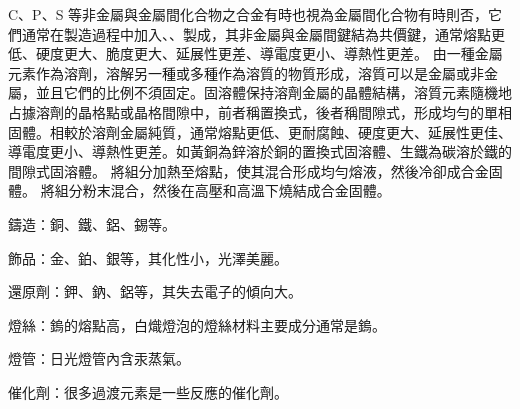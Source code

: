 \documentclass[a4paper,12pt]{report}
\begin{document}
C、P、S 等非金屬與金屬間化合物之合金有時也視為金屬間化合物有時則否，它們通常在製造過程中加入、、製成，其非金屬與金屬間鍵結為共價鍵，通常熔點更低、硬度更大、脆度更大、延展性更差、導電度更小、導熱性更差。
由一種金屬元素作為溶劑，溶解另一種或多種作為溶質的物質形成，溶質可以是金屬或非金屬，並且它們的比例不須固定。固溶體保持溶劑金屬的晶體結構，溶質元素隨機地占據溶劑的晶格點或晶格間隙中，前者稱置換式，後者稱間隙式，形成均勻的單相固體。相較於溶劑金屬純質，通常熔點更低、更耐腐蝕、硬度更大、延展性更佳、導電度更小、導熱性更差。如黃銅為鋅溶於銅的置換式固溶體、生鐵為碳溶於鐵的間隙式固溶體。
將組分加熱至熔點，使其混合形成均勻熔液，然後冷卻成合金固體。
將組分粉末混合，然後在高壓和高溫下燒結成合金固體。
\bit
\item 鑄造：銅、鐵、鋁、錫等。
\item 飾品：金、鉑、銀等，其化性小，光澤美麗。
\item 還原劑：鉀、鈉、鋁等，其失去電子的傾向大。
\item 燈絲：鎢的熔點高，白熾燈泡的燈絲材料主要成分通常是鎢。
\item 燈管：日光燈管內含汞蒸氣。
\item 催化劑：很多過渡元素是一些反應的催化劑。
\eit
\end{document}
